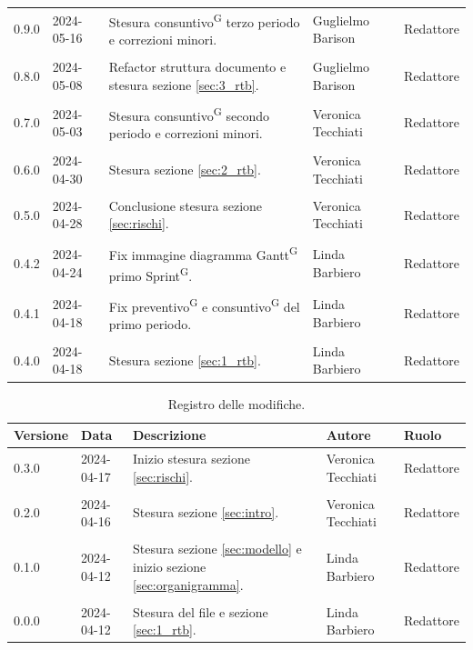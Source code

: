 \documentclass[8pt]{article}
\newcommand{\glossterm}[1]{#1\textsuperscript{G}} %
\begin{document}
\begin{table}[ht!]
\begin{tabular}{p{1.2cm} p{2cm} p{6cm} p{3cm} p{2cm}}
		0.9.0 & 2024-05-16 & Stesura \glossterm{consuntivo} terzo periodo e correzioni minori. & Guglielmo Barison & Redattore \\\\
        0.8.0 & 2024-05-08 & Refactor struttura documento e stesura sezione \ref{sec:3_rtb}. & Guglielmo Barison & Redattore \\\\
        0.7.0 & 2024-05-03 & Stesura \glossterm{consuntivo} secondo periodo e correzioni minori. & Veronica Tecchiati & Redattore \\\\
        0.6.0 & 2024-04-30 & Stesura sezione \ref{sec:2_rtb}. & Veronica Tecchiati & Redattore \\\\
        0.5.0 & 2024-04-28 & Conclusione stesura sezione \ref{sec:rischi}. & Veronica Tecchiati & Redattore \\\\
		0.4.2 & 2024-04-24 & Fix immagine diagramma \glossterm{Gantt} primo \glossterm{Sprint}. & Linda Barbiero & Redattore \\\\
		0.4.1 & 2024-04-18 & Fix \glossterm{preventivo} e \glossterm{consuntivo} del primo periodo. & Linda Barbiero & Redattore \\\\
		0.4.0 & 2024-04-18 & Stesura sezione \ref{sec:1_rtb}. & Linda Barbiero & Redattore \\
		\bottomrule
\end{tabular}
\newpage
\clearpage
\end{table}
\begin{table}[H]
\hypersetup{hidelinks}
	\centering
	\begin{tabular}{p{1.2cm} p{2cm} p{6cm} p{3cm} p{2cm}}
		\toprule
		\textbf{Versione}& \textbf{Data} & \textbf{Descrizione} & \textbf{Autore} & \textbf{Ruolo} \\
		\midrule 
    0.3.0 & 2024-04-17 & Inizio stesura sezione \ref{sec:rischi}. & Veronica Tecchiati & Redattore \\\\
		0.2.0 & 2024-04-16 & Stesura sezione \ref{sec:intro}. & Veronica Tecchiati & Redattore \\\\
		0.1.0 & 2024-04-12 & Stesura sezione \ref{sec:modello} e inizio sezione \ref{sec:organigramma}. & Linda Barbiero & Redattore \\\\
		0.0.0 & 2024-04-12 & Stesura del file e sezione \ref{sec:1_rtb}. & Linda Barbiero & Redattore \\
		\bottomrule
	\end{tabular}
	\caption{Registro delle modifiche.}
	\label{table:Registro delle modifiche}
\end{table}
\newpage
\clearpage
{\hypersetup{hidelinks} \tableofcontents}
\clearpage
\newpage
\newpage
{\hypersetup{hidelinks} \listoffigures}
\newpage
{\hypersetup{hidelinks} \listoftables}
\newpage
\justifying
\end{document}
